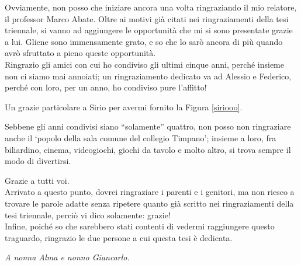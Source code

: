 Ovviamente, non posso che iniziare ancora una volta ringraziando il mio relatore, il professor Marco Abate. Oltre ai motivi già citati nei ringraziamenti della tesi triennale, si vanno ad aggiungere le opportunità che mi si sono presentate grazie a lui. Gliene sono immensamente grato, e so che lo sarò ancora di più quando avrò sfruttato a pieno queste opportunità.\\

Ringrazio gli amici con cui ho condiviso gli ultimi cinque anni, perché insieme non ci siamo mai annoiati; un ringraziamento dedicato va ad Alessio e Federico, perché con loro, per un anno, ho condiviso pure l'affitto!

Un grazie particolare a Sirio per avermi fornito la Figura \ref{siriooo}.

Sebbene gli anni condivisi siano ``solamente'' quattro, non posso non ringraziare anche il `popolo della sala comune del collegio Timpano'; insieme a loro, fra biliardino, cinema, videogiochi, giochi da tavolo e molto altro, si trova sempre il modo di divertirsi.

Grazie a tutti voi.\\

Arrivato a questo punto, dovrei ringraziare i parenti e i genitori, ma non riesco a trovare le parole adatte senza ripetere quanto già scritto nei ringraziamenti della tesi triennale, perciò vi dico solamente: grazie!\\

Infine, poiché so che sarebbero stati contenti di vedermi raggiungere questo traguardo, ringrazio le due persone a cui questa tesi è dedicata.

\textit{A nonna Alma e nonno Giancarlo.}